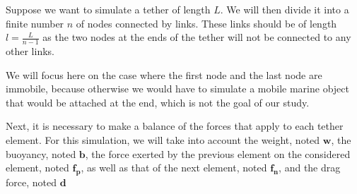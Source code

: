 Suppose we want to simulate a tether of length $L$. We will then divide it into a finite number $n$ of nodes connected by links. These links should be of length $l=\frac{L}{n-1}$ as the two nodes at the ends of the tether will not be connected to any other links.

We will focus here on the case where the first node and the last node are immobile, because otherwise we would have to simulate a mobile marine object that would be attached at the end, which is not the goal of our study.

Next, it is necessary to make a balance of the forces that apply to each tether element. For this simulation, we will take into account the weight, noted $\mathbf{w}$, the buoyancy, noted $\mathbf{b}$, the force exerted by the previous element on the considered element, noted $\mathbf{f_p}$, as well as that of the next element, noted $\mathbf{f_n}$, and the drag force, noted $\mathbf{d}$


